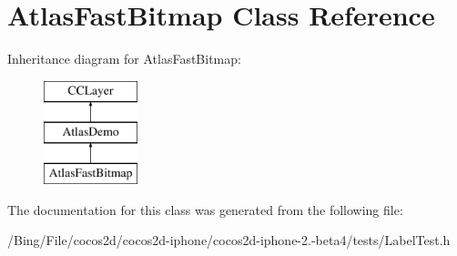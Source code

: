 \hypertarget{interface_atlas_fast_bitmap}{\section{Atlas\-Fast\-Bitmap Class Reference}
\label{interface_atlas_fast_bitmap}
}
Inheritance diagram for Atlas\-Fast\-Bitmap\-:\begin{figure}[H]
\begin{center}
\leavevmode
\includegraphics[height=3.000000cm]{interface_atlas_fast_bitmap}
\end{center}
\end{figure}


The documentation for this class was generated from the following file\-:\begin{DoxyCompactItemize}
\item 
/\-Bing/\-File/cocos2d/cocos2d-\/iphone/cocos2d-\/iphone-\/2.-\/beta4/tests/Label\-Test.\-h\end{DoxyCompactItemize}

